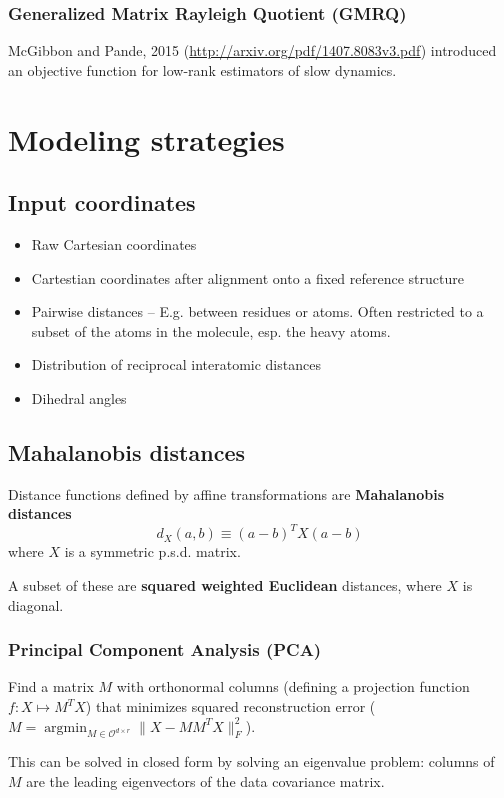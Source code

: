 \documentclass[aps,prl,preprint,nofootinbib,superscriptaddress,linenumbers]{revtex4-1}
\DeclareMathOperator*{\argmin}{argmin}
\newcommand{\bemph}[1]{\textbf{#1}}
\begin{document}
\subsubsection{Generalized Matrix Rayleigh Quotient (GMRQ)}
McGibbon and Pande, 2015 (\url{http://arxiv.org/pdf/1407.8083v3.pdf}) introduced an objective function for low-rank estimators of slow dynamics.

\section{Modeling strategies}


\subsection{Input coordinates}
\begin{itemize}
	\item Raw Cartesian coordinates
	\item Cartestian coordinates after alignment onto a fixed reference structure
	\item Pairwise distances -- E.g. between residues or atoms. Often restricted to a subset of the atoms in the molecule, esp. the heavy atoms.
	\item Distribution of reciprocal interatomic distances
	\item Dihedral angles
\end{itemize}


\subsection{Mahalanobis distances}
Distance functions defined by affine transformations are \bemph{Mahalanobis distances} $$d_X(a,b) \equiv (a-b)^T X (a-b) $$ where $X$ is a symmetric p.s.d. matrix.

A subset of these are \bemph{squared weighted Euclidean} distances, where $X$ is diagonal.

\subsubsection{Principal Component Analysis (PCA)}
Find a matrix $M$ with orthonormal columns (defining a projection function $f:X\mapsto M^T X$) that minimizes squared reconstruction error ($M = \argmin_{M \in \mathcal{O}^{d \times r}} \|X-MM^TX\|^2_F$).

This can be solved in closed form by solving an eigenvalue problem: columns of $M$ are the leading eigenvectors of the data covariance matrix.
\end{document}
